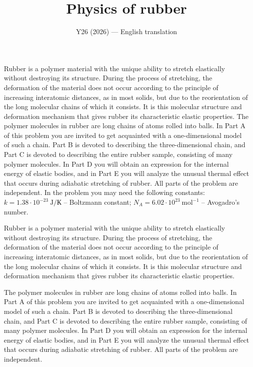 \documentclass[11pt,a4paper]{article}
\title{\textbf{Physics of rubber}}
\author{\normalsize Y26 (2026) --- English translation}
\date{}
\begin{document}
\maketitle

Rubber is a polymer material with the unique ability to stretch elastically without destroying its structure. During the process of stretching, the deformation of the material does not occur according to the principle of increasing interatomic distances, as in most solids, but due to the reorientation of the long molecular chains of which it consists. It is this molecular structure and deformation mechanism that gives rubber its characteristic elastic properties. The polymer molecules in rubber are long chains of atoms rolled into balls. In Part A of this problem you are invited to get acquainted with a one-dimensional model of such a chain. Part B is devoted to describing the three-dimensional chain, and Part C is devoted to describing the entire rubber sample, consisting of many polymer molecules. In Part D you will obtain an expression for the internal energy of elastic bodies, and in Part E you will analyze the unusual thermal effect that occurs during adiabatic stretching of rubber. All parts of the problem are independent. In the problem you may need the following constants: $k = 1.38\cdot10^{-23}~\text{J}/\text{К}$ – Boltzmann constant; $N_A = 6.02\cdot 10^{23}~\text{mol}^{-1}$ – Avogadro’s number.

Rubber is a polymer material with the unique ability to stretch elastically without destroying its structure. During the process of stretching, the deformation of the material does not occur according to the principle of increasing interatomic distances, as in most solids, but due to the reorientation of the long molecular chains of which it consists. It is this molecular structure and deformation mechanism that gives rubber its characteristic elastic properties.

The polymer molecules in rubber are long chains of atoms rolled into balls. In Part A of this problem you are invited to get acquainted with a one-dimensional model of such a chain. Part B is devoted to describing the three-dimensional chain, and Part C is devoted to describing the entire rubber sample, consisting of many polymer molecules. In Part D you will obtain an expression for the internal energy of elastic bodies, and in Part E you will analyze the unusual thermal effect that occurs during adiabatic stretching of rubber. All parts of the problem are independent.
\end{document}
